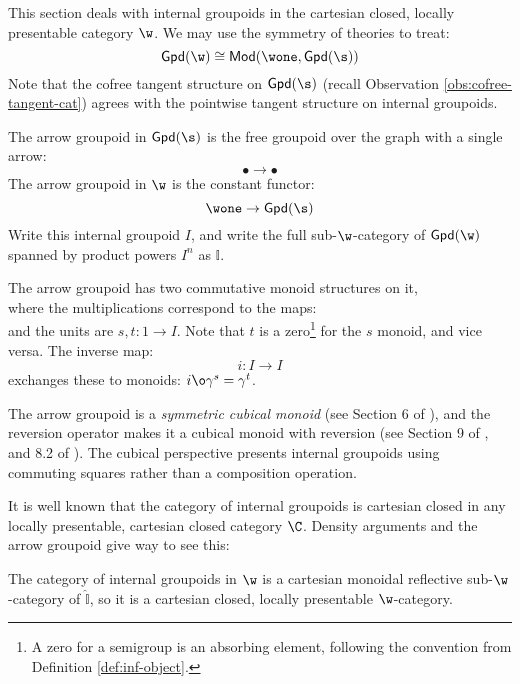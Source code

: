 This section deals with internal groupoids in the cartesian closed, locally presentable category $\w$. We may use the symmetry of theories to treat:
\[
	\mathsf{Gpd}(\w) \cong \mathsf{Mod}(\wone, \mathsf{Gpd}(\s))
\]
Note that the cofree tangent structure on $\mathsf{Gpd}(\s)$ (recall Observation \ref{obs:cofree-tangent-cat}) agrees with the pointwise tangent structure on internal groupoids.
\begin{definition}%
	\label{def:arrow-gpd}
	The arrow groupoid in $\mathsf{Gpd}(\s)$ is the free groupoid over the graph with a single arrow:
	\[
		\bullet \to \bullet
	\]
	The arrow groupoid in $\w$ is the constant functor:
	\[
		\wone \to \mathsf{Gpd}(\s)
	\]
	Write this internal groupoid $I$, and write the full sub-$\w$-category of $\mathsf{Gpd}(\w)$ spanned by product powers $I^n$ as $\mathbb{I}$.
\end{definition}
\begin{lemma}%
	\label{lem:arr-gpd-cub-monoid}
	The arrow groupoid has two commutative monoid structures on it,
	\[
		
	\]
	where the multiplications correspond to the maps:
	\[\]
	and the units are $s,t:1 \to I$. Note that $t$ is a zero\footnote{A zero for a semigroup is an absorbing element, following the convention from Definition \ref{def:inf-object}.} for the $s$ monoid, and vice versa. The inverse map:
	\[
		i: I \to I
	\]
	exchanges these to monoids: $i \o \gamma^s = \gamma^t$.
\end{lemma}
\begin{remark}
	The arrow groupoid is a \emph{symmetric cubical monoid} (see Section 6 of \cite{Grandis2003}), and the reversion operator makes it a cubical monoid with reversion (see Section 9 of \cite{Grandis2003}, and 8.2 of \cite{Mauri2017}). The cubical perspective presents internal groupoids using commuting squares rather than a composition operation.
\end{remark}
It is well known that the category of internal groupoids is cartesian closed in any locally presentable, cartesian closed category $\C$. Density arguments and the arrow groupoid give way to see this:
\begin{proposition}
	The category of internal groupoids in $\w$ is a cartesian monoidal reflective sub-$\w$-category of $\widehat{\mathbb{I}}$, so it is a cartesian closed, locally presentable $\w$-category.
\end{proposition}
